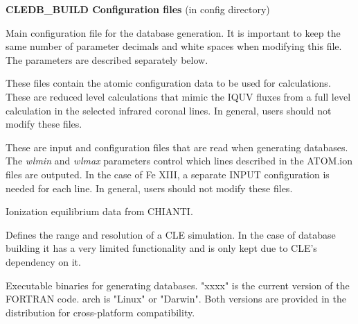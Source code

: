 \documentclass{article}
\begin{document}
\textbf{CLEDB\_BUILD Configuration files} (in config directory)
\begin{description}
    [font=\normalfont,leftmargin=1.3in,style=multiline]
	\item[DB.INPUT]
	Main configuration file for the database generation. It is important to keep the same number of parameter decimals and white spaces when modifying this file. The parameters are described separately below. 
    \item[ATOM.ion]
    	These files contain the atomic configuration data to be used for calculations. These are reduced level calculations that mimic the IQUV fluxes from a full level calculation in the selected infrared coronal lines. In general, users should not modify these files.
	\item[INPUT.ion(a/b)]
	These are input and configuration files that are read when generating databases. The \emph{wlmin} and \emph{wlmax} parameters control which lines described in the ATOM.ion files are outputed. In the case of Fe XIII, a separate INPUT configuration is needed for each line. In general, users should not modify these files.   
	\item[IONEQ]
	Ionization equilibrium data from CHIANTI.
	\item[GRID.DAT]
	Defines the range and resolution of a CLE simulation. In the case of database building it has a very limited functionality and is only kept due to CLE's dependency on it.
	\item[db"xxxx"\_"arch"]
	Executable binaries for generating databases. "xxxx" is the current version of the FORTRAN code. arch is "Linux" or "Darwin". Both versions are provided in the distribution for cross-platform compatibility.	
\end{description}
    
\end{document}
